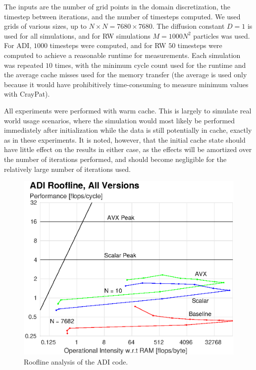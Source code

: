 \documentclass[letterpaper]{article}
\begin{document}
The inputs are the number of grid points in the domain discretization, the timestep between iterations, and the number of timesteps computed. We used grids of various sizes, up to $N\times N=7680\times7680$. The diffusion constant $D=1$ is used for all simulations, and for RW simulations $M=1000N^2$ particles was used. For ADI, $1000$ timesteps were computed, and for RW $50$ timesteps were computed to achieve a reasonable runtime for measurements. Each simulation was repeated $10$ times, with the minimum cycle count used for the runtime and the average cache misses used for the memory transfer (the average is used only because it would have prohibitively time-consuming to measure minimum values with CrayPat).

All experiments were performed with warm cache. This is largely to simulate real world usage scenarios, where the simulation would most likely be performed immediately after initialization while the data is still potentially in cache, exactly as in these experiments. It is noted, however, that the initial cache state should have little effect on the results in either case, as the effects will be amortized over the number of iterations performed, and should become negligible for the relatively large number of iterations used.

\begin{figure}\centering
  \includegraphics[width=\linewidth]{./plots/roofline_ADI_all.eps}
  \caption{Roofline analysis of the ADI code.}
  \label{fig:roofline_ADI_all}
\end{figure}
\end{document}
